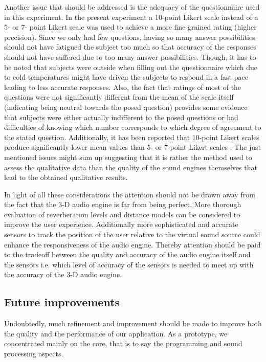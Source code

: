 \documentclass[journal]{IEEEtran}
\begin{document}
Another issue that should be addressed is the adequacy of the questionnaire used in this experiment. In the present experiment a 10-point Likert scale instead of a 5- or 7- point Likert scale was used to achieve a more fine grained rating (higher precision). Since we only had few questions, having so many answer possibilities should not have fatigued the subject too much so that accuracy of the responses should not have suffered due to too many answer possibilities. Though, it has to be noted that subjects were outside when filling out the questionnaire which due to cold temperatures might have driven the subjects to respond in a fast pace leading to less accurate responses. Also, the fact that ratings of most of the questions were not significantly different from the mean of the scale itself (indicating being neutral towards the posed question) provides some evidence that subjects were either actually indifferent to the posed questions or had difficulties of knowing which number corresponds to which degree of agreement to the stated question. Additionally, it has been reported that 10-point Likert scales produce significantly lower mean values than 5- or 7-point Likert scales \cite{Dawes2012}. The just mentioned issues might sum up suggesting that it is rather the method used to assess the qualitative data than the quality of the sound engines themselves that lead to the obtained qualitative results. 

In light of all these considerations the attention should not be drawn away from the fact that the 3-D audio engine is far from being perfect. More thorough evaluation of reverberation levels and distance models can be considered to improve the user experience. Additionally more sophisticated and accurate sensors to track the position of the user relative to the virtual sound source could enhance the responsiveness of the audio engine. Thereby attention should be paid to the tradeoff between the quality and accuracy of the audio engine itself and the sensors i.e. which level of accuracy of the sensors is needed to meet up with the accuracy of the 3-D audio engine. 

\subsection{Future improvements}
Undoubtedly, much refinement and improvement should be made to improve both the quality and the performance of our application. As a prototype, we concentrated mainly on the core, that is to say the programming and sound processing aspects. \\
\end{document}
